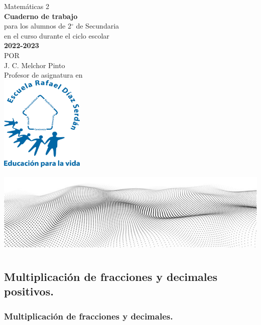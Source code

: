 \documentclass[11pt]{book}
\begin{document}
\pagestyle{empty}
\begin{center}
  {\Huge Matem\'aticas 2}\\
  \vspace{2cm}
  \normalsize
  \textbf{\large Cuaderno de trabajo}\\
  para los alumnos de 2$^\circ$ de  Secundaria\\
  en el curso durante el ciclo escolar\\
  \textbf{2022-2023}\\
  \vspace{2.5cm}
  \small POR\\
  \Large J. C. Melchor Pinto\\[0.5em]
  \normalsize Profesor de asignatura en\\
  \vspace{1cm}
  \includegraphics[width=4cm]{./Unidad 2/Images/LOGO_RDS_nobg}
\end{center}
\vspace{2cm}
%
\hspace{-16mm}
\includegraphics[width=\paperwidth]{./Unidad 2/Images/cover_bg}
\restoregeometry
\tableofcontents
\chapter{}

\section{Multiplicación de fracciones y decimales positivos.}
\subsection{Multiplicación de fracciones y decimales.}
\end{document}
